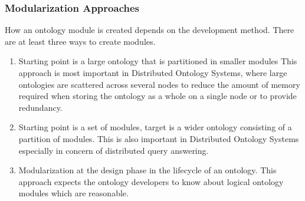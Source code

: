 \subsubsection{Modularization Approaches}
How an ontology module is created depends on the development method. There are
at least three ways to create modules.
\begin{enumerate}
        \item Starting point is a large ontology that is partitioned in smaller modules
                This approach is most important in  Distributed Ontology Systems,
                where large ontologies are scattered across several nodes to reduce
                the amount of memory required when storing the ontology as a whole
                on a single node or to provide redundancy.
        \item Starting point is a set of modules, target is a wider ontology
                consisting of a partition of modules. This is also important in
                Distributed Ontology Systems especially in concern of distributed
                query answering.
        \item Modularization at the design phase in the lifecycle of an ontology.
                This approach expects the ontology developers to know about
                logical ontology modules which are reasonable.
\end{enumerate}

